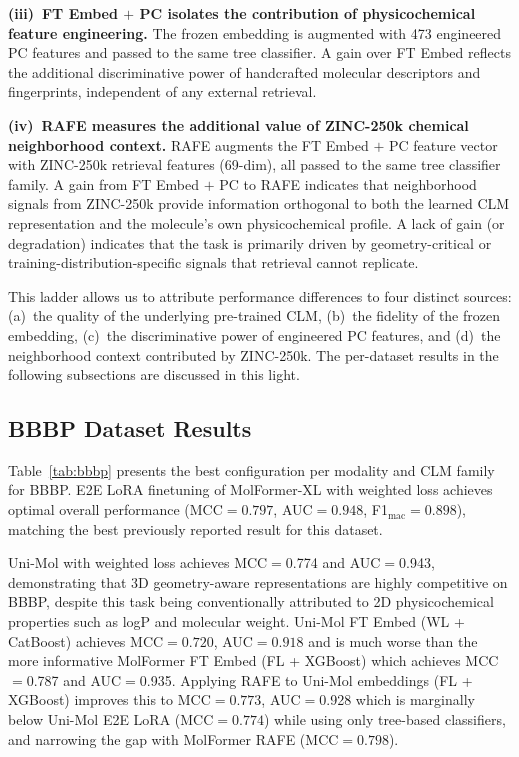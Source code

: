 \documentclass[9pt,twocolumn,conference]{IEEEtran}
\begin{document}
\textbf{(iii)~FT Embed $+$ PC isolates the contribution of physicochemical feature engineering.} The frozen embedding is augmented with 473 engineered PC features and passed to the same tree classifier. A gain over FT Embed reflects the additional discriminative power of handcrafted molecular descriptors and fingerprints, independent of any external retrieval.

\textbf{(iv)~RAFE measures the additional value of ZINC-250k chemical neighborhood context.} RAFE augments the FT Embed $+$ PC feature vector with ZINC-250k retrieval features (69-dim), all passed to the same tree classifier family. A gain from FT Embed $+$ PC to RAFE indicates that neighborhood signals from ZINC-250k provide information orthogonal to both the learned CLM representation and the molecule's own physicochemical profile. A lack of gain (or degradation) indicates that the task is primarily driven by geometry-critical or training-distribution-specific signals that retrieval cannot replicate.

This ladder allows us to attribute performance differences to four distinct sources: 
(a)~the quality of the underlying pre-trained CLM, (b)~the fidelity of the frozen embedding, (c)~the discriminative power of engineered PC features, and (d)~the neighborhood context contributed by ZINC-250k. The per-dataset results in the following subsections are discussed in this light.
\subsection{BBBP Dataset Results}
Table~\ref{tab:bbbp} presents the best configuration per modality and CLM family for BBBP. E2E LoRA finetuning of MolFormer-XL with weighted loss achieves optimal overall performance
(MCC$=0.797$, AUC$=0.948$, F1$_\text{mac}=0.898$), matching the best previously reported result for this dataset.

Uni-Mol with weighted loss achieves MCC$=$0.774 and AUC$=$0.943, demonstrating that 3D geometry-aware representations are highly competitive on BBBP, despite this task being conventionally attributed to 2D physicochemical properties such as logP and molecular weight. Uni-Mol FT Embed (WL + CatBoost) achieves MCC$=0.720$, AUC$=0.918$ and is much worse than the more informative MolFormer FT Embed (FL + XGBoost) which achieves MCC$=$0.787 and AUC$=$0.935. Applying RAFE to Uni-Mol embeddings (FL + XGBoost) improves this to MCC$=0.773$, AUC$=$0.928 which is marginally below Uni-Mol E2E LoRA (MCC$=0.774$) while using only tree-based classifiers, and narrowing the gap with MolFormer RAFE (MCC$=0.798$).
\end{document}
